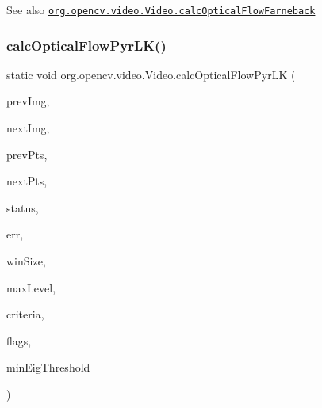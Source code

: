 \begin{DoxySeeAlso}{See also}
\href{http://docs.opencv.org/modules/video/doc/motion_analysis_and_object_tracking.html#calcopticalflowfarneback}{\tt org.\+opencv.\+video.\+Video.\+calc\+Optical\+Flow\+Farneback} 
\end{DoxySeeAlso}
\mbox{\label{classorg_1_1opencv_1_1video_1_1_video_af905ed0b09b612cdbfd3196135e40ef1}} 
\subsubsection{\texorpdfstring{calc\+Optical\+Flow\+Pyr\+L\+K()}{calcOpticalFlowPyrLK()}\hspace{0.1cm}{\footnotesize\ttfamily [1/3]}}
{\footnotesize\ttfamily static void org.\+opencv.\+video.\+Video.\+calc\+Optical\+Flow\+Pyr\+LK (\begin{DoxyParamCaption}\item[{\mbox{\hyperlink{classorg_1_1opencv_1_1core_1_1_mat}{Mat}}}]{prev\+Img,  }\item[{\mbox{\hyperlink{classorg_1_1opencv_1_1core_1_1_mat}{Mat}}}]{next\+Img,  }\item[{\mbox{\hyperlink{classorg_1_1opencv_1_1core_1_1_mat_of_point2f}{Mat\+Of\+Point2f}}}]{prev\+Pts,  }\item[{\mbox{\hyperlink{classorg_1_1opencv_1_1core_1_1_mat_of_point2f}{Mat\+Of\+Point2f}}}]{next\+Pts,  }\item[{\mbox{\hyperlink{classorg_1_1opencv_1_1core_1_1_mat_of_byte}{Mat\+Of\+Byte}}}]{status,  }\item[{\mbox{\hyperlink{classorg_1_1opencv_1_1core_1_1_mat_of_float}{Mat\+Of\+Float}}}]{err,  }\item[{\mbox{\hyperlink{classorg_1_1opencv_1_1core_1_1_size}{Size}}}]{win\+Size,  }\item[{int}]{max\+Level,  }\item[{\mbox{\hyperlink{classorg_1_1opencv_1_1core_1_1_term_criteria}{Term\+Criteria}}}]{criteria,  }\item[{int}]{flags,  }\item[{double}]{min\+Eig\+Threshold }\end{DoxyParamCaption})\hspace{0.3cm}{\ttfamily [static]}}

